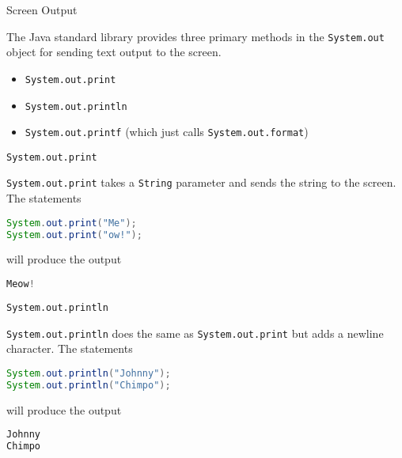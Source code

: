 \documentclass{beamer}
\author[Chris Simpkins] 
{Christopher Simpkins \\\texttt{chris.simpkins@gatech.edu}}
\institute[Georgia Tech] %
\date[CS 1331]{}
\begin{document}
\begin{frame}
  \titlepage
\end{frame}


\begin{frame}[fragile]{Screen Output}


The Java standard library provides three primary methods in the {\tt System.out} object for sending text output to the screen.

\begin{itemize}
\item {\tt System.out.print} 
\item {\tt System.out.println} 
\item {\tt System.out.printf} (which just calls {\tt System.out.format})
\end{itemize}

\end{frame}

\begin{frame}[fragile]{{\tt System.out.print}}


{\tt System.out.print} takes a {\tt String} parameter and sends the string to the screen.  The statements
\begin{lstlisting}[language=Java]
System.out.print("Me");
System.out.print("ow!");
\end{lstlisting}
will produce the output
\begin{lstlisting}[language=Java]
Meow!
\end{lstlisting}

\end{frame}

\begin{frame}[fragile]{{\tt System.out.println}}


{\tt System.out.println} does the same as {\tt System.out.print} but adds a newline character.  The statements
\begin{lstlisting}[language=Java]
System.out.println("Johnny");
System.out.println("Chimpo");
\end{lstlisting}
will produce the output
\begin{lstlisting}[language=Java]
Johnny
Chimpo
\end{lstlisting}

\end{frame}
\end{document}
